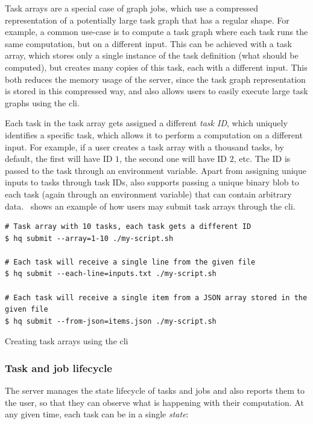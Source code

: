 Task arrays are a special case of graph jobs, which use a compressed representation of a
potentially large task graph that has a regular shape. For example, a common use-case is to compute
a task graph where each task runs the same computation, but on a different input. This can be
achieved with a task array, which stores only a single instance of the task definition (what should
be computed), but creates many copies of this task, each with a different input. This both reduces
the memory usage of the server, since the task graph representation is stored in this compressed
way, and also allows users to easily execute large task graphs using the \gls{cli}.

Each task in the task array gets assigned a different \emph{task ID}, which uniquely
identifies a specific task, which allows it to perform a computation on a different input. For
example, if a user creates a task array with a thousand tasks, by default, the first will have ID
$1$, the second one will have ID $2$, etc. The ID is passed to
the task through an environment variable. Apart from assigning unique inputs to tasks through task
IDs, \hq{} also supports passing a unique binary blob to each task (again through
an environment variable) that can contain arbitrary data.~ shows an example
of how users may submit task arrays through the \gls{cli}.

\begin{listing}[h]
	\begin{verbatim}
# Task array with 10 tasks, each task gets a different ID
$ hq submit --array=1-10 ./my-script.sh

# Each task will receive a single line from the given file
$ hq submit --each-line=inputs.txt ./my-script.sh

# Each task will receive a single item from a JSON array stored in the given file
$ hq submit --from-json=items.json ./my-script.sh
	\end{verbatim}
	\caption{Creating task arrays using the \hyperqueue{} \gls{cli}}
	\label{lst:hq-cli-task-arrays}
\end{listing}

\subsubsection*{Task and job lifecycle}
The server manages the state lifecycle of tasks and jobs and also reports them to the user, so that
they can observe what is happening with their computation. At any given time, each task can be in a
single \emph{state}:

